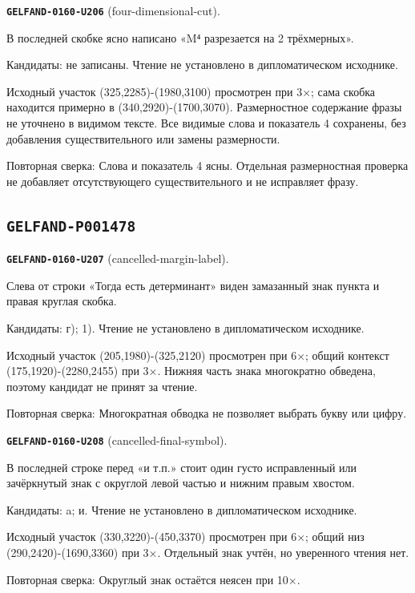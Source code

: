 \par\noindent\leavevmode{}\label{GELFAND-0160-U206}\label{GELFAND-P001477:four-dimensional-cut}\textbf{\texttt{GELFAND-0160-U206}} (four-dimensional-cut).\nopagebreak[4]\par
В последней скобке ясно написано «M⁴ разрезается на 2 трёхмерных».\par
Кандидаты: не записаны. Чтение не установлено в дипломатическом исходнике.\par
Исходный участок (325,2285)-(1980,3100) просмотрен при 3×; сама скобка находится примерно в (340,2920)-(1700,3070). Размерностное содержание фразы не уточнено в видимом тексте. Все видимые слова и показатель 4 сохранены, без добавления существительного или замены размерности.\par
Повторная сверка: Слова и показатель 4 ясны. Отдельная размерностная проверка не добавляет отсутствующего существительного и не исправляет фразу.\par\medskip
\subsection*{\texttt{GELFAND-P001478}}
\par\noindent\leavevmode{}\label{GELFAND-0160-U207}\label{GELFAND-P001478:cancelled-margin-label}\textbf{\texttt{GELFAND-0160-U207}} (cancelled-margin-label).\nopagebreak[4]\par
Слева от строки «Тогда есть детерминант» виден замазанный знак пункта и правая круглая скобка.\par
Кандидаты: г); 1). Чтение не установлено в дипломатическом исходнике.\par
Исходный участок (205,1980)-(325,2120) просмотрен при 6×; общий контекст (175,1920)-(2280,2455) при 3×. Нижняя часть знака многократно обведена, поэтому кандидат не принят за чтение.\par
Повторная сверка: Многократная обводка не позволяет выбрать букву или цифру.\par\medskip
\par\noindent\leavevmode{}\label{GELFAND-0160-U208}\label{GELFAND-P001478:cancelled-final-symbol}\textbf{\texttt{GELFAND-0160-U208}} (cancelled-final-symbol).\nopagebreak[4]\par
В последней строке перед «и т.п.» стоит один густо исправленный или зачёркнутый знак с округлой левой частью и нижним правым хвостом.\par
Кандидаты: a; и. Чтение не установлено в дипломатическом исходнике.\par
Исходный участок (330,3220)-(450,3370) просмотрен при 6×; общий низ (290,2420)-(1690,3360) при 3×. Отдельный знак учтён, но уверенного чтения нет.\par
Повторная сверка: Округлый знак остаётся неясен при 10×.\par\medskip
